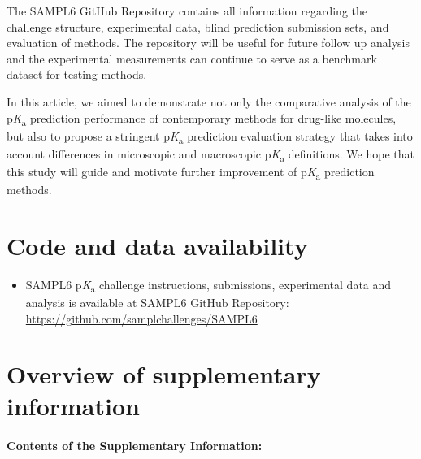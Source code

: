 \documentclass[9pt,lineno,final]{elife}
\newcommand{\pKa}{p\textit{K}\textsubscript{a}}
\begin{document}
The SAMPL6 GitHub Repository contains all information regarding the challenge structure, experimental data, blind prediction submission sets, and evaluation of methods. 
The repository will be useful for future follow up analysis and the experimental measurements can continue to serve as a benchmark dataset for testing methods. 

In this article, we aimed to demonstrate not only the comparative analysis of the \pKa{} prediction performance of contemporary methods for drug-like molecules, but also to propose a stringent \pKa{} prediction evaluation strategy that takes into account differences in microscopic and macroscopic \pKa{} definitions. We hope that this study will guide and motivate further improvement of \pKa{} prediction methods.



\section{Code and data availability} \label{Code-and-Data-Availability}
\begin{minipage}{15cm}
\begin{itemize}

\item SAMPL6 \pKa{} challenge instructions, submissions, experimental data and analysis is available at SAMPL6 GitHub Repository: \href{https://github.com/samplchallenges/SAMPL6}{https://github.com/samplchallenges/SAMPL6}

\end{itemize}
\end{minipage}


\section{Overview of supplementary information}

\paragraph{Contents of the Supplementary Information:}
\end{document}

